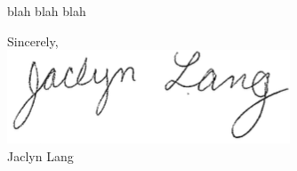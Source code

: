 \documentclass[11pt]{letter}
\begin{document}
\begin{letter}
blah blah blah


\closing{Sincerely, \\[0.0in] \includegraphics{signature.png}\\ Jaclyn Lang}
\end{letter}
\end{document}
